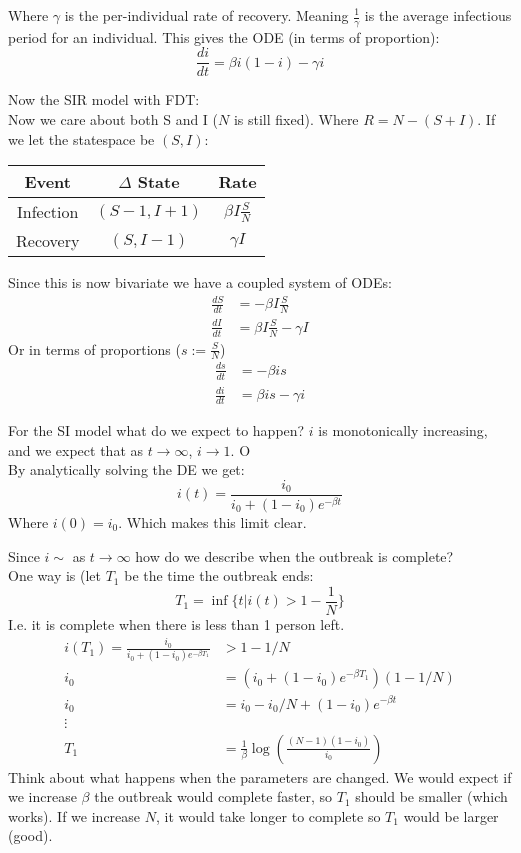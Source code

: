 \documentclass{/home/janmebows/Documents/LatexTemplates/myassignment}
\begin{document}
Where $\gamma$ is the per-individual rate of recovery. Meaning
$\frac1\gamma$ is the average infectious period for an individual.
This gives the ODE (in terms of proportion):
\[\frac{di}{dt} = \beta i(1-i) - \gamma i\]

Now the SIR model with FDT:\\
Now we care about both S and I ($N$ is still fixed). Where $R = N - (S+I)$.
If we let the statespace be $(S,I)$:
\begin{table}[h]
    \centering
    \begin{tabular}{c|c|c}
         Event&$\Delta$ State&Rate \\
         \hline
         Infection&$(S-1,I+1)$&$\beta I\frac{S}{N}$\\
         Recovery &$(S,I-1)$&$\gamma I$
    \end{tabular}
\end{table}

Since this is now bivariate we have a coupled system of ODEs:
\begin{align*}
    \frac{dS}{dt}&=-\beta I\frac{S}{N}\\
    \frac{dI}{dt}&= \beta I \frac{S}{N} - \gamma I
\end{align*}
Or in terms of proportions ($s:=\frac{S}{N}$)
\begin{align*}
    \frac{ds}{dt}&=-\beta is\\
    \frac{di}{dt}&=\beta is - \gamma i
\end{align*}

For the SI model what do we expect to happen?
$i$ is monotonically increasing, and we expect that as $t\to\infty$, $i\to 1$.
O\\
By analytically solving the DE we get:
\[i(t) = \frac{i_0}{i_0 + (1-i_0)e^{-\beta t}}\]
Where $i(0) =i_0$. Which makes this limit clear.

Since $i \sim $ as $t\to \infty$ how do we describe when the outbreak is complete?\\
One way is (let $T_1$ be the time the outbreak ends:
\[T_1 = \inf\{t | i(t) > 1-\frac{1}{N}\}\]
I.e. it is complete when there is less than 1 person left.
\begin{align*}
    i(T_1) = \frac{i_0}{i_0+(1-i_0)e^{-\beta T_1}} & > 1-1/N\\
    i_0 &= (i_0+(1-i_0)e^{-\beta T_1})(1-1/N)\\
    i_0&=i_0 - i_0/N + (1-i_0)e^{-\beta t}\\
    \vdots\\
    T_1&= \frac{1}{\beta} \log\left(\frac{(N-1)(1-i_0)}{i_0}\right)
\end{align*}
Think about what happens when the parameters are changed.
We would expect if we increase $\beta$ the outbreak would complete faster, so $T_1$ should be smaller (which works). If we increase $N$, it would take longer to complete so $T_1$ would be larger (good).
\end{document}
